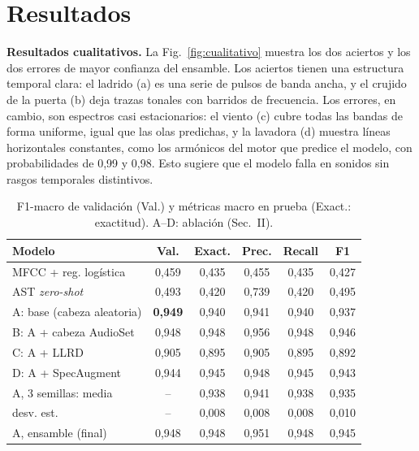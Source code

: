 \documentclass[letterpaper, 10 pt, conference]{ieeeconf}
\begin{document}
\section{Resultados}






\textbf{Resultados cualitativos.} La Fig.~\ref{fig:cualitativo} muestra los dos aciertos y los dos errores de mayor confianza del ensamble. Los aciertos tienen una estructura temporal clara: el ladrido (a) es una serie de pulsos de banda ancha, y el crujido de la puerta (b) deja trazas tonales con barridos de frecuencia. Los errores, en cambio, son espectros casi estacionarios: el viento (c) cubre todas las bandas de forma uniforme, igual que las olas predichas, y la lavadora (d) muestra líneas horizontales constantes, como los armónicos del motor que predice el modelo, con probabilidades de 0,99 y 0,98. Esto sugiere que el modelo falla en sonidos sin rasgos temporales distintivos.

\begin{table}[!t]
\centering
\caption{F1-macro de validación (Val.) y métricas macro en prueba (Exact.: exactitud). A--D: ablación (Sec.~II).}
\label{tab:resultados}
\footnotesize
\setlength{\tabcolsep}{3.6pt}
\begin{tabular}{lccccc}
\toprule
\textbf{Modelo} & \textbf{Val.} & \textbf{Exact.} & \textbf{Prec.} & \textbf{Recall} & \textbf{F1} \\
\midrule
MFCC + reg. logística & 0,459 & 0,435 & 0,455 & 0,435 & 0,427 \\
AST \textit{zero-shot} & 0,493 & 0,420 & 0,739 & 0,420 & 0,495 \\
\midrule
A: base (cabeza aleatoria) & \textbf{0,949} & 0,940 & 0,941 & 0,940 & 0,937 \\
B: A + cabeza AudioSet & 0,948 & 0,948 & 0,956 & 0,948 & 0,946 \\
C: A + LLRD & 0,905 & 0,895 & 0,905 & 0,895 & 0,892 \\
D: A + SpecAugment & 0,944 & 0,945 & 0,948 & 0,945 & 0,943 \\
\midrule
A, 3 semillas: media & -- & 0,938 & 0,941 & 0,938 & 0,935 \\
\hspace{6.5em}desv. est. & -- & 0,008 & 0,008 & 0,008 & 0,010 \\
A, ensamble (final) & 0,948 & 0,948 & 0,951 & 0,948 & 0,945 \\
\bottomrule
\end{tabular}
\end{table}
\end{document}
